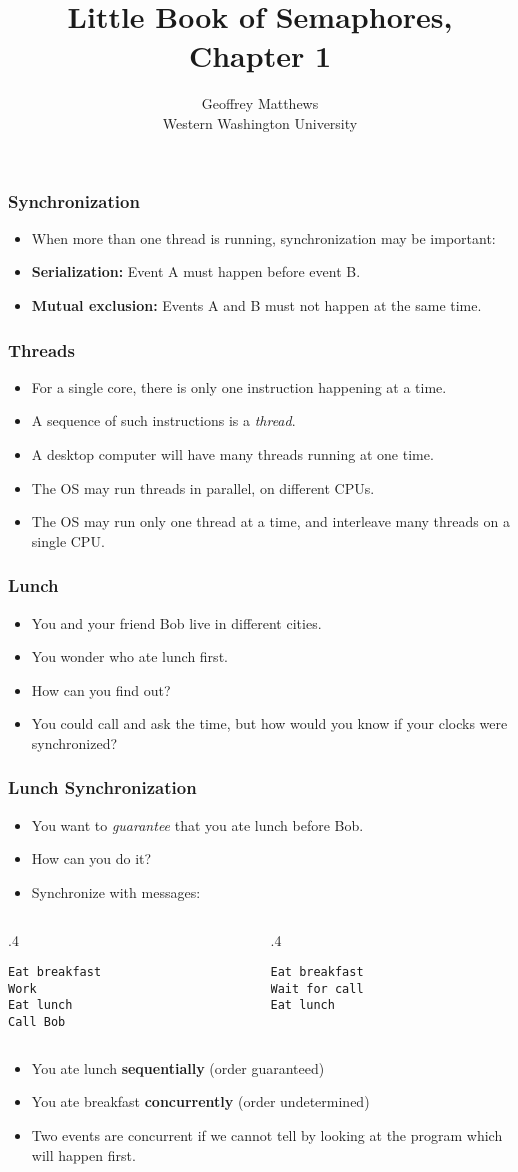 \documentclass{beamer}
\title{Little Book of Semaphores, Chapter 1}
\author{Geoffrey Matthews\\
\small Western Washington University}
\newcommand{\bi}{\begin{itemize}}
\newcommand{\ii}{\item}
\newcommand{\ei}{\end{itemize}}
\newcommand{\bfr}[1]{\begin{frame}[fragile]\frametitle{{ #1 }}}
\newcommand{\cola}[1]{\begin{columns}\begin{column}{#1\textwidth}}
\newcommand{\colb}[1]{\end{column}\begin{column}{#1\textwidth}}
\newcommand{\colc}{\end{column}\end{columns}}
\begin{document}
\maketitle


\bfr{Synchronization}
\bi
\ii When more than one thread is running, synchronization may be
important: 
\ii {\bf Serialization:}  Event A must happen before event B.
\ii {\bf Mutual exclusion:}  Events A and B must not happen at the same time.
\ei
\end{frame}

\bfr{Threads}
\bi
\ii For a single core, there is only one instruction happening at a time.
\ii A sequence of such instructions is a {\em thread}.
\ii A desktop computer will have many threads running at one time.
\ii The OS may run threads in parallel, on different CPUs.
\ii The OS may run only one thread at a time, and interleave many
threads on a single CPU.
\ei

\end{frame}

\bfr{Lunch}
\bi
\ii You and your friend Bob live in different cities.
\ii You wonder who ate lunch first.
\ii How can you find out?
\pause
\ii You could call and ask the time, but how would you know if your
clocks were synchronized?
\ei

\end{frame}

\bfr{Lunch Synchronization}
\bi
\ii You want to {\em guarantee} that you ate lunch before Bob.
\ii How can you do it?
\pause
\ii Synchronize with messages:
\ei
\cola{.4}
\begin{Verbatim}[label=You]
Eat breakfast
Work
Eat lunch
Call Bob
\end{Verbatim}
\colb{.4}
\begin{Verbatim}[label=Bob]
Eat breakfast
Wait for call
Eat lunch
\end{Verbatim}
\colc
\pause
\bi
\ii You ate lunch {\bf sequentially} (order guaranteed)
\ii You ate breakfast {\bf concurrently} (order undetermined)
\pause
\ii
Two events are concurrent if we cannot tell by looking at the program
which will happen first.
\ei

\end{frame}
\end{document}
